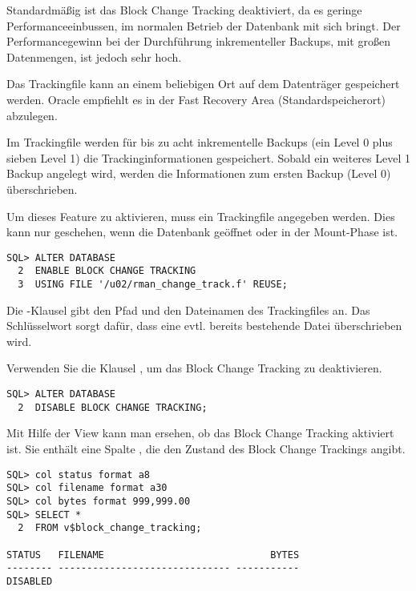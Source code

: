         Standardm\"a\ss{}ig ist das Block Change Tracking deaktiviert, da es geringe Performanceeinbussen, im normalen Betrieb der Datenbank mit sich bringt. Der Performancegewinn bei der Durchf\"uhrung inkrementeller Backups, mit gro\ss{}en Datenmengen, ist jedoch sehr hoch.

        Das Trackingfile kann an einem beliebigen Ort auf dem Datentr\"ager gespeichert werden. Oracle empfiehlt es in der Fast Recovery Area (Standardspeicherort) abzulegen.

        \begin{merke}
          Im Trackingfile werden f\"ur bis zu acht inkrementelle Backups (ein Level 0 plus sieben Level 1) die Trackinginformationen gespeichert. Sobald ein weiteres Level 1 Backup angelegt wird, werden die Informationen zum ersten Backup (Level 0) \"uberschrieben.
        \end{merke}
        Um dieses Feature zu aktivieren, muss ein Trackingfile angegeben werden. Dies kann nur geschehen, wenn die Datenbank ge\"offnet oder in der Mount-Phase ist.
        \begin{lstlisting}[caption={Block Change Tracking
        aktivieren},label=admin1344,language=oracle_sql]
SQL> ALTER DATABASE
  2  ENABLE BLOCK CHANGE TRACKING
  3  USING FILE '/u02/rman_change_track.f' REUSE;
        \end{lstlisting}
        Die -Klausel gibt den Pfad und den Dateinamen des Tracking\-files an. Das Schl\"us\-sel\-wort  sorgt daf\"ur, dass eine evtl. bereits bestehende Datei \"uberschrieben wird.

        Verwenden Sie die Klausel , um das Block Change Tracking zu deaktivieren.
        \begin{lstlisting}[caption={Block Change Tracking deaktivieren},label=admin1345,language=oracle_sql]
SQL> ALTER DATABASE
  2  DISABLE BLOCK CHANGE TRACKING;
        \end{lstlisting}
        Mit Hilfe der View  kann man ersehen, ob das Block Change Tracking aktiviert ist. Sie enth\"alt eine Spalte , die den Zustand des Block Change Trackings angibt.
        \begin{lstlisting}[caption={Den Status des Block Change Trackings \"uberpr\"ufen},label=admin1346,language=oracle_sql,alsolanguage=sqlplus]
SQL> col status format a8 
SQL> col filename format a30
SQL> col bytes format 999,999.00
SQL> SELECT *
  2  FROM v$block_change_tracking;

STATUS   FILENAME                             BYTES
-------- ------------------------------ -----------
DISABLED
        \end{lstlisting}
        \begin{literaturinternet}
          \item \cite{BRADV89537}
        \end{literaturinternet}
